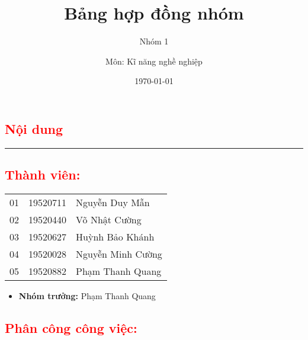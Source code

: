 \documentclass{article}
\title{\Huge{\textbf{Bảng hợp đồng nhóm}}}
\author{Nhóm 1}
\author{Môn: Kĩ năng nghề nghiệp}
\date{\today}
\begin{document}
\maketitle

\textcolor{red}{\chapter*{\Huge{{Nội dung}}}}

\noindent
{\color{cyan} \rule{\linewidth}{0.5mm} }


\textcolor{red}{\section{\Large{Thành viên:}}}

\begin{center}
    \begin{tabular}{|l|l|l|}
         \hline
         \color{red}{STT} & \color{red}{MSSV} & \color{red}{Họ và tên} \\
         \hline
         01 & 19520711 & Nguyễn Duy Mẫn \\
         \hline
         02 & 19520440 & Võ Nhật Cường \\
         \hline
         03 & 19520627 & Huỳnh Bảo Khánh \\
         \hline
         04 & 19520028 & Nguyễn Minh Cường \\
         \hline
         05 & 19520882 & Phạm Thanh Quang \\
         \hline
    \end{tabular}
\end{center}

\begin{itemize}
    \item \textbf{Nhóm trưởng: } Phạm Thanh Quang
\end{itemize}




\textcolor{red}{\section{\Large{Phân công công việc:}}}
\end{document}
